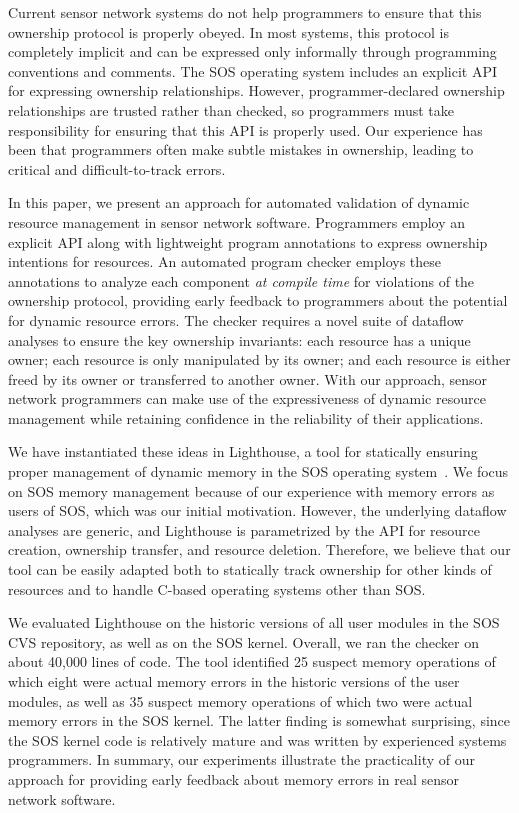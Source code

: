 Current sensor network systems do not help programmers to ensure that this
ownership protocol is properly obeyed.  
%
In most systems, this protocol is completely implicit and can be expressed
only informally through programming conventions and comments.  
%
The SOS operating system includes an explicit API for expressing ownership
relationships.  
%
However, programmer-declared ownership relationships are trusted rather than
checked, so programmers must take responsibility for ensuring that this API
is properly used.  
%
Our experience has been that programmers often make subtle mistakes in
ownership, leading to critical and difficult-to-track errors.  



In this paper, we present an approach for automated validation of dynamic
resource management in sensor network software.  
%
Programmers employ an explicit API along with lightweight program
annotations to express ownership intentions for resources.  
%
An automated program checker employs these annotations to analyze each
component {\em at compile time} for violations of the ownership protocol,
providing early feedback to programmers about the potential for dynamic
resource errors.  
%
The checker requires a novel suite of dataflow analyses to ensure the key
ownership invariants:  each resource has a unique owner; each resource is
only manipulated by its owner; and each resource is either freed by its
owner or transferred to another owner.  
%
With our approach, sensor network programmers can make use of the
expressiveness of dynamic resource management while retaining confidence in
the reliability of their applications.



We have instantiated these ideas in Lighthouse, a tool for statically
ensuring proper management of dynamic memory in the SOS operating
system~\cite{sos}.  
%
We focus on SOS memory management because of our experience with memory
errors as users of SOS, which was our initial motivation.  
%
However, the underlying dataflow analyses are generic, and Lighthouse is
parametrized by the API for resource creation, ownership transfer, and
resource deletion.  
%
Therefore, we believe that our tool can be easily adapted both to statically
track ownership for other kinds of resources and to handle C-based operating
systems other than SOS.



We evaluated Lighthouse on the historic versions of all user modules in the
SOS CVS repository, as well as on the SOS kernel.  
%
Overall, we ran the checker on about 40,000 lines of code.  
%
The tool identified 25 suspect memory operations of which eight were actual
memory errors in the historic versions of the user modules, as well as 35
suspect memory operations of which two were actual memory errors in the SOS
kernel.  
%
The latter finding is somewhat surprising, since the SOS kernel code is
relatively mature and was written by experienced systems programmers.  
%
In summary, our experiments illustrate the practicality of our approach for
providing early feedback about memory errors in real sensor network
software.



